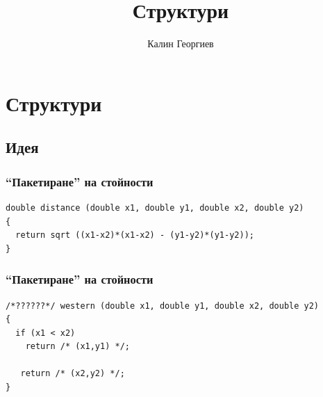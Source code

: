 \documentclass{beamer}
\begin{document}
\title[Увод в програмирането]{Структури} 
\author{Калин Георгиев} 
\frame{\titlepage} 

\section{Структури} 
\subsection{Идея}

\begin{frame}[fragile]
\frametitle{``Пакетиране'' на стойности}

\begin{lstlisting}
double distance (double x1, double y1, double x2, double y2)
{
  return sqrt ((x1-x2)*(x1-x2) - (y1-y2)*(y1-y2));
}

\end{lstlisting}	
\end{frame}


\begin{frame}[fragile]
\frametitle{``Пакетиране'' на стойности} 

\begin{lstlisting}
/*??????*/ western (double x1, double y1, double x2, double y2)
{
  if (x1 < x2)
    return /* (x1,y1) */;

   return /* (x2,y2) */;
}
\end{lstlisting}  

\end{frame}
\end{document}
